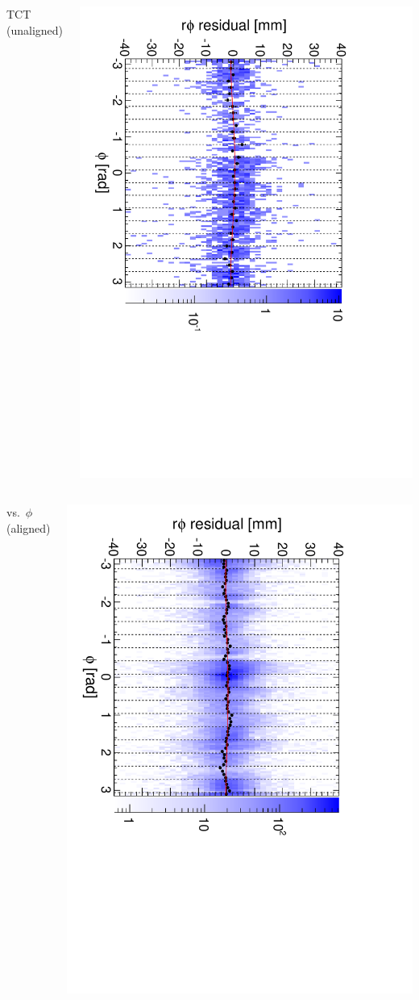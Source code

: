 \documentclass[compress]{beamer}
\begin{document}
\begin{frame}
\begin{columns}
\centering TCT (unaligned)

\includegraphics[height=\linewidth, angle=90]{diskiter01_m2to3_TST.pdf}
\end{columns}

\begin{columns}
\centering vs.\ $\phi$ (aligned)

\includegraphics[height=\linewidth, angle=90]{diskiter02_m2to3.pdf}


\end{columns}
\end{frame}
\end{document}
